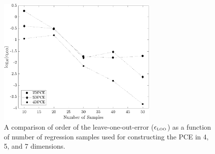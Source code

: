 \clearpage

\begin{figure}[p]
 \begin{center}
  \includegraphics[width=0.70\textwidth]{./Figures/err_samples_borehole}
\caption{A comparison of order of the leave-one-out-error 
($\epsilon_{\mbox{\tiny{LOO}}}$) as a function of number of regression samples
used for constructing the PCE in 4, 5, and 7 dimensions.}
\label{fig:conv_bore}
\end{center}
\end{figure}

\clearpage

